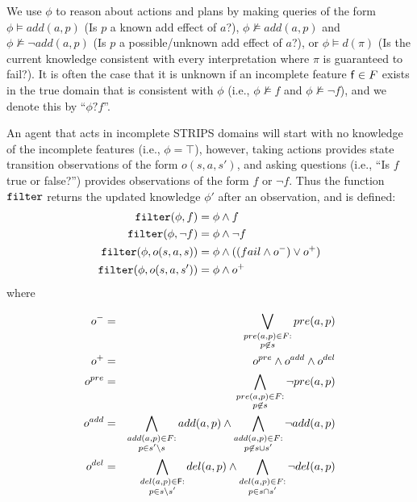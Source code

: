 \documentclass{article}
\begin{document}
We use $\phi$ to reason about actions and
plans by making queries of the form $\phi \models
add({a}, p)$ (Is $p$ a known add effect of
${a}$?), $\phi \not\models add({a}, p)$ and $\phi
\not \models \neg add({a}, p)$  (Is $p$ a
possible/unknown add effect of ${a}$?),  or $\phi \models d(\pi)$ (Is the
current knowledge consistent with every interpretation where $\pi$ is guaranteed
to fail?).  It is often the case that it is unknown if an incomplete feature
${\sf f} \in F$ exists in the true domain that is consistent with $\phi$ (i.e., $\phi \not\models f$ and $\phi \not\models
\neg f$), and we denote this by ``$\phi?f$''.



 An agent that acts in incomplete STRIPS domains
will start with no knowledge of the incomplete features (i.e., $\phi = \top$),
however, taking actions provides state transition observations of the form $o(s,
a, s')$, and asking questions (i.e., ``Is $f$ true or false?'') provides
observations of the form $f$ or $\neg f$.  Thus the function ${\tt filter}$
returns the updated knowledge $\phi'$ after an observation, and is
defined:
\begin{align*}
{\tt filter}(\phi, f) & = \phi \wedge f \\
{\tt filter}(\phi, \neg f) & = \phi \wedge \neg f \\
{\tt filter}(\phi, o(s, a, s)) & = \phi \wedge ((fail \wedge o^-) \vee  o^+)\\
{\tt filter}(\phi, o(s, a, s')) & = \phi \wedge  o^+
\end{align*}
 where 
 
\begin{eqnarray*}
o^- &=& \bigvee\limits_{\substack{pre({a},p) \in 
F:\\ p \not\in s} } pre({a},p) 
\label{eqn:update1} \\
o^+ &=& o^{pre} \wedge o^{add} \wedge o^{del}\label{eqn:update2}\\
o^{pre} &=& \bigwedge\limits_{\substack{pre({a},p)
 \in F:\\ p \not\in s} }\neg pre({a},p)
 \label{eqn:update3}  \\
o^{add} &=& \bigwedge\limits_{\substack{add({a},p) \in 
F:\\ p\in s'\backslash s} }add({a},p) 
  \wedge \bigwedge\limits_{\substack{add({a},p) \in 
  F: \\ p \not\in  s\cup s'}} \neg 
  add({a},p)   \label{eqn:update4}\\
o^{del} &=& 
\bigwedge\limits_{\substack{del({a},p) \in {\sf
F}: \\p \in s \backslash s'}}
del({a},p)  \wedge
\bigwedge\limits_{\substack{del({a},p)
\in F:\\ p \in s\cap s'}}\neg
del({a},p)  \label{eqn:update5}
\end{eqnarray*}
\end{document}
